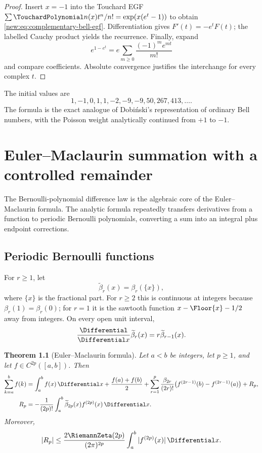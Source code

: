 \documentclass[11pt,a4paper,oneside,openany]{book}
\newtheorem{theorem}{Theorem}[chapter]
\theoremstyle{definition}
\theoremstyle{remark}
\begin{document}
\begin{proof}
Insert $x=-1$ into the Touchard EGF
$\sum \TouchardPolynomial n(x)t^n/n!=\exp(x(e^t-1))$ to obtain
\eqref{new:eq:complementary-bell-egf}.  Differentiation gives
$F'(t)=-e^tF(t)$; the labelled Cauchy product yields the recurrence.  Finally,
expand
\[
 e^{1-e^t}=e\sum_{m\ge0}\frac{(-1)^m e^{mt}}{m!}
\]
and compare coefficients.  Absolute convergence justifies the interchange for
every complex $t$.
\end{proof}

The initial values are
\[
 1,-1,0,1,1,-2,-9,-9,50,267,413,\ldots.
\]
The formula is the exact analogue of Dobi\'nski's representation of ordinary
Bell numbers, with the Poisson weight analytically continued from $+1$ to
$-1$.

\chapter{Euler--Maclaurin summation with a controlled remainder}
\label{ch:euler-maclaurin}

The Bernoulli-polynomial difference law is the algebraic core of the
Euler--Maclaurin formula.  The analytic formula repeatedly transfers
derivatives from a function to periodic Bernoulli polynomials, converting a
sum into an integral plus endpoint corrections.

\section{Periodic Bernoulli functions}

For $r\ge1$, let
\[
 \widetilde\beta_r(x)=\beta_r(\{x\}),
\]
where $\{x\}$ is the fractional part.  For $r\ge2$ this is continuous at
integers because $\beta_r(1)=\beta_r(0)$; for $r=1$ it is the sawtooth function
$x-\Floor{x}-1/2$ away from integers.  On every open unit interval,
\[
 \frac{\Differential}{\Differential x}\widetilde\beta_r(x)
 =r\widetilde\beta_{r-1}(x).
\]

\begin{theorem}[Euler--Maclaurin formula]
Let $a<b$ be integers, let $p\ge1$, and let $f\in C^{2p}([a,b])$.  Then
\begin{align}
 \sum_{k=a}^{b}f(k)
 &=\int_a^bf(x)\,\Differential x+\frac{f(a)+f(b)}2
 +\sum_{r=1}^{p}\frac{\beta_{2r}}{(2r)!}
  \bigl(f^{(2r-1)}(b)-f^{(2r-1)}(a)\bigr)
 +R_p,
 \label{new:eq:euler-maclaurin}\\
 R_p&=-\frac1{(2p)!}\int_a^b
 \widetilde\beta_{2p}(x)f^{(2p)}(x)\,\Differential x.
 \label{new:eq:euler-maclaurin-remainder}
\end{align}
Moreover,
\begin{equation}
 |R_p|\le
 \frac{2\RiemannZeta(2p)}{(2\pi)^{2p}}
 \int_a^b|f^{(2p)}(x)|\,\Differential x.
 \label{new:eq:euler-maclaurin-bound}
\end{equation}
\end{theorem}
\end{document}

